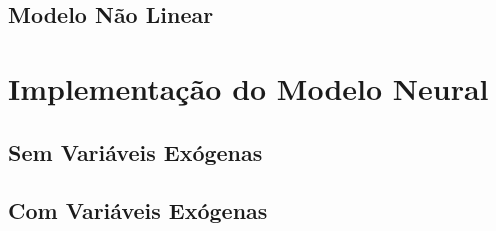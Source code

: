 \subsection{Modelo Não Linear} %


\section{Implementação do Modelo Neural} %

\subsection{Sem Variáveis Exógenas} %

\subsection{Com Variáveis Exógenas} %